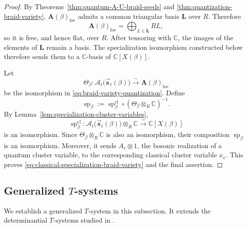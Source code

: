 \documentclass[12pt, reqno]{amsart}
\theoremstyle{plain}
\theoremstyle{definition}
\numberwithin{equation}{section}
\newcommand{\CC}{\mathbb{C}}
\begin{document}
\begin{proof}
By Theorems~\ref{thm:quantum-A-U-braid-seeds} and
\ref{thm:quantization-braid-variety},
\(\mathbf A(\beta)_{\mathrm{loc}}\) admits a common triangular basis
\(\mathbf L\) over \(R\). Therefore
\[
    \mathbf A(\beta)_{\mathrm{loc}}
    =
    \bigoplus_{L\in\mathbf L}RL,
\]
so it is free, and hence flat, over \(R\). After tensoring with
\(\CC\), the images of the elements of \(\mathbf L\) remain a
basis. The specialization isomorphism constructed below therefore
sends them to a \(\CC\)-basis of \(\CC[X(\beta)]\).

Let
\[
    \Theta_\beta\colon
    \mathcal A_t\bigl(
        \overrightarrow{\mathbf s}_t(\beta)
    \bigr)
    \xrightarrow{\sim}
    \mathbf A(\beta)_{\mathrm{loc}}
\]
be the isomorphism in
\eqref{eq:braid-variety-quantization}. Define
\[
    \operatorname{sp}_\beta
    :=
    \operatorname{sp}^{\mathrm{cl}}_\beta
    \circ
    \left(
        \Theta_\beta\otimes_R\CC
    \right)^{-1}.
\]
By Lemma~\ref{lem:specialization-cluster-variables},
\[
    \operatorname{sp}^{\mathrm{cl}}_\beta\colon
    \mathcal A_t\bigl(
        \overrightarrow{\mathbf s}_t(\beta)
    \bigr)\otimes_R\CC
    \xrightarrow{\sim}
    \CC[X(\beta)]
\]
is an isomorphism. Since
\(\Theta_\beta\otimes_R\CC\) is also an isomorphism,
their composition \(\operatorname{sp}_\beta\) is an isomorphism.
Moreover, it sends \(A_v\otimes1\), the bosonic realization of a
quantum cluster variable, to the corresponding classical cluster
variable \(x_v\). This proves
\eqref{eq:classical-specialization-braid-variety} and the final
assertion.
\end{proof}


\subsection{Generalized \texorpdfstring{\(T\)}{T}-systems}\label{sec:T-system}
We  establish a generalized \(T\)-system in this subsection. It extends the
determinantial \(T\)-systems studied in
\cite{qin2024analogs,kashiwara2025monoidal,bi2025cluster}.
\end{document}
